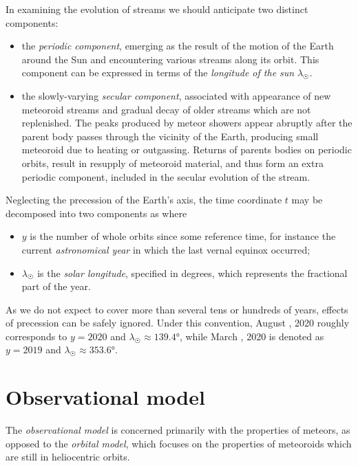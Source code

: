         In examining the evolution of streams we should anticipate two distinct components:
        \begin{itemize}
            \item the \emph{periodic component}, emerging as the result of the motion of the Earth
                around the Sun and encountering various streams along its orbit.
                This component can be expressed in terms of the \emph{longitude of the sun} $\lambda_\Sun$.

            \item the slowly-varying \emph{secular component}, associated with appearance of new meteoroid
                streams and gradual decay of older streams which are not replenished.
                The peaks produced by meteor showers appear abruptly after the parent body passes through the vicinity of the Earth,
                producing small meteoroid due to heating or outgassing.
                Returns of parents bodies on periodic orbits, result in resupply of meteoroid material,
                and thus form an extra periodic component, included in the secular evolution of the stream.
        \end{itemize}

        Neglecting the precession of the Earth's axis, the time coordinate $t$ may be decomposed into two components as
        where
        \begin{itemize}
            \item $y$ is the number of whole orbits since some reference time, for instance
                the current \emph{astronomical year} in which the last vernal equinox occurred;
            \item $\lambda_\Sun$ is the \emph{solar longitude}, specified in degrees, which represents the fractional part of the year.
        \end{itemize}

        As we do not expect to cover more than several tens or hundreds of years, effects of precession can be safely ignored.
        Under this convention, August , 2020 roughly corresponds to $y = 2020$ and $\lambda_\Sun \approx \ang{139.4}$,
        while March , 2020 is denoted as $y = 2019$ and $\lambda_\Sun \approx \ang{353.6}$.


\section{Observational model} \label{ms}
    The \emph{observational model} is concerned primarily with the properties of meteors,
    as opposed to the \emph{orbital model}, which focuses on the properties of meteoroids
    which are still in heliocentric orbits.

